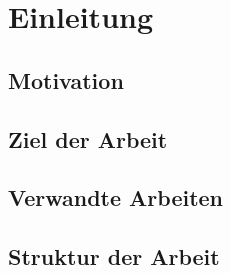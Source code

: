 \chapter{Einleitung}\label{chap:einleitung}

\section{Motivation}

\section{Ziel der Arbeit}

\section{Verwandte Arbeiten}

\section{Struktur der Arbeit}
